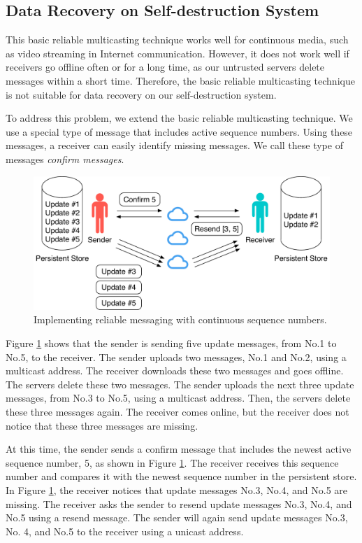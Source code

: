 \documentclass[a4paper,11pt]{report}
\begin{document}
\subsection{Data Recovery on Self-destruction System}

This basic reliable multicasting technique works well for continuous media, such as video streaming in Internet communication.
However, it does not work well if receivers go offline often or for a long time, as our untrusted servers delete messages within a short time.
Therefore, the basic reliable multicasting technique is not suitable for data recovery on our self-destruction system.

To address this problem, we extend the basic reliable multicasting technique.
We use a special type of message that includes active sequence numbers.
Using these messages, a receiver can easily identify missing messages.
We call these type of messages \emph{confirm messages}.

\begin{figure}[t]
	\centering
	\includegraphics[scale=0.6]{reliable_sync}
	\caption{Implementing reliable messaging with continuous sequence numbers.}
	\label{fig:reliable_messaging}
\end{figure}

Figure \ref{fig:reliable_messaging} shows that the sender is sending five update messages, from No.1 to No.5, to the receiver.
The sender uploads two messages, No.1 and No.2, using a multicast address.
The receiver downloads these two messages and goes offline.
The servers delete these two messages.
The sender uploads the next three update messages, from No.3 to No.5, using a multicast address.
Then, the servers delete these three messages again.
The receiver comes online, but the receiver does not notice that these three messages are missing.

At this time, the sender sends a confirm message that includes the newest active sequence number, 5, as shown in Figure \ref{fig:reliable_messaging}.
The receiver receives this sequence number and compares it with the newest sequence number in the persistent store.
In Figure \ref{fig:reliable_messaging}, the receiver notices that update messages No.3, No.4, and No.5 are missing.
The receiver asks the sender to resend update messages No.3, No.4, and No.5 using a resend message.
The sender will again send update messages No.3, No. 4, and No.5 to the receiver using a unicast address.
\end{document}
